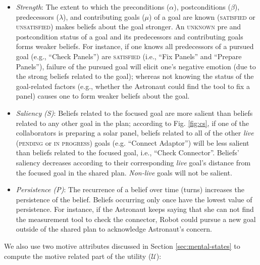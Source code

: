 \documentclass[12pt]{report}
\begin{document}
\begin{itemize}
  \setlength\itemsep{1mm}
  \item \textit{Strength}: The extent to which the preconditions ($\alpha$),
  postconditions ($\beta$), predecessors ($\lambda$), and contributing goals
  ($\mu$) of a goal are known (\textsc{satisfied} or \textsc{unsatisfied}) makes
  beliefs about the goal stronger. An \textsc{unknown} pre and postcondition
  status of a goal and its predecessors and contributing goals forms weaker
  beliefs. For instance, if one knows all predecessors of a pursued goal (e.g.,
  ``Check Panels'') are \textsc{satisfied} (i.e., ``Fix Panels'' and ``Prepare
  Panels''), failure of the pursued goal will elicit one's negative emotion (due
  to the strong beliefs related to the goal); whereas not knowing the status of
  the goal-related factors (e.g., whether the Astronaut could find the tool to
  fix a panel) causes one to form weaker beliefs about the goal.
  \item \textit{Saliency (S)}: Beliefs related to the focused goal are more
  salient than beliefs related to any other goal in the plan; according to
  Fig. \ref{fig:cs}, if one of the collaborators is preparing a solar panel,
  beliefs related to all of the other \textit{live} (\textsc{pending} or
  \textsc{in progress}) goals (e.g. ``Connect Adaptor'') will be less salient
  than beliefs related to the focused goal, i.e., ``Check Connector''. Beliefs'
  saliency decreases according to their corresponding \textit{live} goal's
  distance from the focused goal in the shared plan. \textit{Non-live} goals
  will not be salient.
  \item \textit{Persistence (P)}: The recurrence of a belief over time (turns)
  increases the persistence of the belief. Beliefs occurring only once have the
  lowest value of persistence. For instance, if the Astronaut keeps saying that
  she can not find the measurement tool to check the connector, Robot could  
  pursue a new goal outside of the shared plan to acknowledge Astronaut's
  concern.
\end{itemize}

\noindent We also use two motive attributes discussed in Section
\ref{sec:mental-states} to compute the motive related part of the utility
($\mathcal{U}$):
\end{document}
